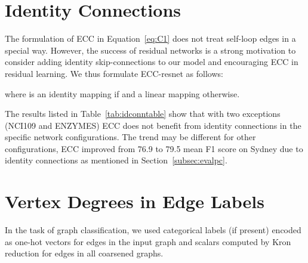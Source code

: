 \documentclass[10pt,twocolumn,letterpaper]{article}
\begin{document}
\section{Identity Connections} \label{sec:idconn}

The formulation of ECC in Equation~\ref{eq:C1} does not treat self-loop edges in a special way. However, the success of residual networks \cite{residuals} is a strong motivation to consider adding identity skip-connections to our model and encouraging ECC in residual learning. We thus formulate ECC-resnet as follows:



where  is an identity mapping if  and a linear mapping otherwise.

The results listed in Table~\ref{tab:idconntable} show that with two exceptions (NCI109 and ENZYMES) ECC does not benefit from identity connections in the specific network configurations. The trend may be different for other configurations, \eg ECC  improved from 76.9 to 79.5 mean F1 score on Sydney due to identity connections as mentioned in Section~\ref{subsec:evalpc}.



\begin{table}[bt]
\centering
{}
\vspace{1ex}
\caption{\label{tab:idconntable}
The effect of adding identity connections (improvements in italics). Performance metrics vary and are specific to each dataset, as introduced in the main paper.}
\end{table}





\section{Vertex Degrees in Edge Labels} \label{sec:degrees}

In the task of graph classification, we used categorical labels (if present) encoded as one-hot vectors for edges in the input graph and scalars computed by Kron reduction for edges in all coarsened graphs. 
\end{document}
